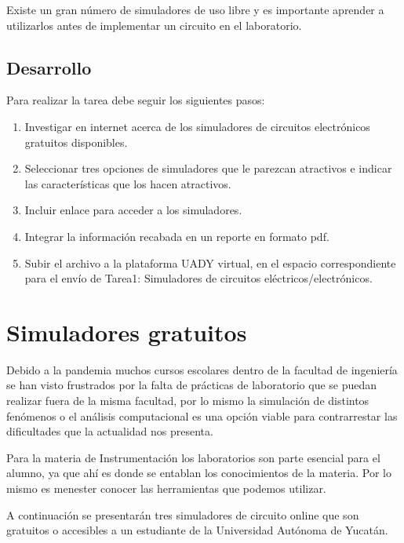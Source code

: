 \documentclass[11pt]{report}
\theoremstyle{plain}
\theoremstyle{definition}
\begin{document}
Existe un gran número de simuladores de uso libre y es importante aprender a utilizarlos antes de implementar un circuito en el laboratorio.



\section{Desarrollo}

Para realizar la tarea debe seguir los siguientes pasos:

\begin{enumerate}
	\item Investigar en internet acerca de los simuladores de circuitos electrónicos gratuitos disponibles.
	\item Seleccionar tres opciones de simuladores que le parezcan atractivos e indicar las características que los hacen atractivos.
	\item Incluir enlace para acceder a los simuladores.
	\item Integrar la información recabada en un reporte en formato pdf.
	\item Subir el archivo a la plataforma UADY virtual, en el espacio correspondiente para el envío de Tarea1: Simuladores de circuitos eléctricos/electrónicos.
\end{enumerate}



\chapter{Simuladores gratuitos}

Debido a la pandemia muchos cursos escolares dentro de la facultad de ingeniería se han visto frustrados por la falta de prácticas de laboratorio que se puedan realizar fuera de la misma facultad, por lo mismo la simulación de distintos fenómenos o el análisis computacional es una opción viable para contrarrestar las dificultades que la actualidad nos presenta.


Para la materia de Instrumentación los laboratorios son parte esencial para el alumno, ya que ahí es donde se entablan los conocimientos de la materia. Por lo mismo es menester conocer las herramientas que podemos utilizar.


A continuación se presentarán tres simuladores de circuito online que son gratuitos o accesibles a un estudiante de la Universidad Autónoma de Yucatán.
\end{document}
